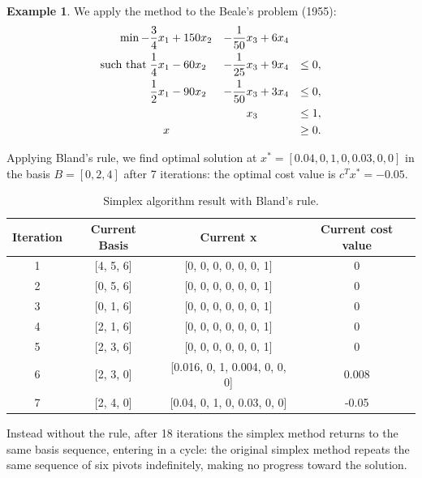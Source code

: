 \documentclass[a4paper,10 pt,titlepage,twoside]{book}
\theoremstyle{plain}
\theoremstyle{definition}
\newtheorem{ex}[thm]{Example}
\theoremstyle{remark}
\begin{document}
\begin{ex}
	We apply the method to the Beale's problem (1955): %
	\begin{alignat*}{4}
	\min -\frac{3}{4}x_{1}&+150x_{2}&-\frac{1}{50}x_{3}&+6x_{4}&\\
	\text{such that\;}\frac{1}{4}x_{1}&-60x_{2}&-\frac{1}{25}x_{3}&+9x_{4}&\leq 0,\\
	\frac{1}{2}x_{1}&-90x_{2}&-\frac{1}{50}x_{3}&+3x_{4}&\leq 0,\\
	&\;&x_{3}&\;&\leq 1,\\
	x&\;&\;&\;&\geq 0.\\
	\end{alignat*}
	
Applying Bland's rule, we find optimal solution at $x^{*} = [0.04, 0,  1,   0,  0.03, 0,   0  ]$ in the basis $B = [0, 2, 4]$ after 7 iterations: the optimal cost value is $c^{T}x^{*} = -0.05$.\\

\begin{table}[h]
	\begin{center}
	\begin{tabular}{cccc}
		\hline
		\textbf{Iteration} & \textbf{Current Basis} & \textbf{Current x} & \textbf{Current cost value} \\ \hline
		1 & [4, 5, 6] & [0, 0, 0, 0, 0, 0, 1] & 0 \\
		2 & [0, 5, 6] & [0, 0, 0, 0, 0, 0, 1] & 0 \\
		3 & [0, 1, 6] & [0, 0, 0, 0, 0, 0, 1] & 0 \\
		4 & [2, 1, 6] & [0, 0, 0, 0, 0, 0, 1] & 0 \\
		5 & [2, 3, 6] & [0, 0, 0, 0, 0, 0, 1] & 0 \\
		6 & [2, 3, 0] & [0.016, 0, 1, 0.004, 0, 0, 0] & 0.008 \\
		7 & [2, 4, 0] & [0.04, 0, 1, 0, 0.03, 0, 0] & -0.05 \\ \hline
	\end{tabular}\caption{Simplex algorithm result with Bland's rule.}
\end{center}
\end{table}

Instead without the rule, after 18 iterations the simplex method returns to the same basis sequence, entering in a cycle: the original simplex method repeats the same sequence of six pivots indefinitely, making no progress toward the solution.


\end{ex}
\end{document}
